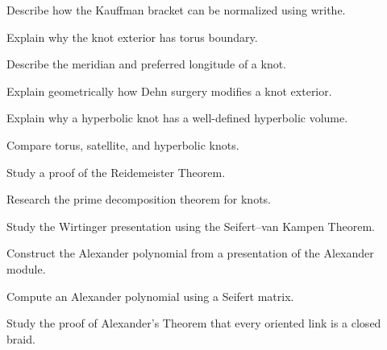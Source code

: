 \begin{exercise}[3]
Describe how the Kauffman bracket can be normalized using writhe.
\end{exercise}

\begin{exercise}[3]
Explain why the knot exterior has torus boundary.
\end{exercise}

\begin{exercise}[3]
Describe the meridian and preferred longitude of a knot.
\end{exercise}

\begin{exercise}[3]
Explain geometrically how Dehn surgery modifies a knot exterior.
\end{exercise}

\begin{exercise}[3]
Explain why a hyperbolic knot has a well-defined hyperbolic volume.
\end{exercise}

\begin{exercise}[3]
Compare torus, satellite, and hyperbolic knots.
\end{exercise}

\begin{exercise}[4]
Study a proof of the Reidemeister Theorem.
\end{exercise}

\begin{exercise}[4]
Research the prime decomposition theorem for knots.
\end{exercise}

\begin{exercise}[4]
Study the Wirtinger presentation using the Seifert--van Kampen Theorem.
\end{exercise}

\begin{exercise}[4]
Construct the Alexander polynomial from a presentation of the Alexander
module.
\end{exercise}

\begin{exercise}[4]
Compute an Alexander polynomial using a Seifert matrix.
\end{exercise}

\begin{exercise}[4]
Study the proof of Alexander's Theorem that every oriented link is a closed
braid.
\end{exercise}

